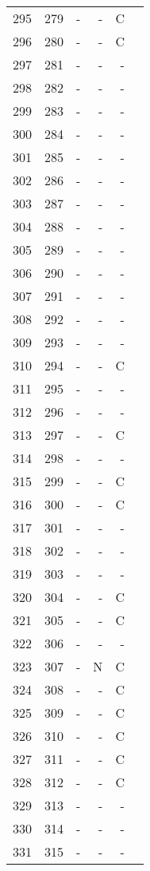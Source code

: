 \begin{longtable}{rrrrrr}
  295 & 279 & - & - & C &  \\ 
  296 & 280 & - & - & C &  \\ 
  297 & 281 & - & - & - &  \\ 
  298 & 282 & - & - & - &  \\ 
  299 & 283 & - & - & - &  \\ 
  300 & 284 & - & - & - &  \\ 
  301 & 285 & - & - & - &  \\ 
  302 & 286 & - & - & - &  \\ 
  303 & 287 & - & - & - &  \\ 
  304 & 288 & - & - & - &  \\ 
  305 & 289 & - & - & - &  \\ 
  306 & 290 & - & - & - &  \\ 
  307 & 291 & - & - & - &  \\ 
  308 & 292 & - & - & - &  \\ 
  309 & 293 & - & - & - &  \\ 
  310 & 294 & - & - & C &  \\ 
  311 & 295 & - & - & - &  \\ 
  312 & 296 & - & - & - &  \\ 
  313 & 297 & - & - & C &  \\ 
  314 & 298 & - & - & - &  \\ 
  315 & 299 & - & - & C &  \\ 
  316 & 300 & - & - & C &  \\ 
  317 & 301 & - & - & - &  \\ 
  318 & 302 & - & - & - &  \\ 
  319 & 303 & - & - & - &  \\ 
  320 & 304 & - & - & C &  \\ 
  321 & 305 & - & - & C &  \\ 
  322 & 306 & - & - & - &  \\ 
  323 & 307 & - & N & C &  \\ 
  324 & 308 & - & - & C &  \\ 
  325 & 309 & - & - & C &  \\ 
  326 & 310 & - & - & C &  \\ 
  327 & 311 & - & - & C &  \\ 
  328 & 312 & - & - & C &  \\ 
  329 & 313 & - & - & - &  \\ 
  330 & 314 & - & - & - &  \\ 
  331 & 315 & - & - & - &  \\ 

\end{longtable}
